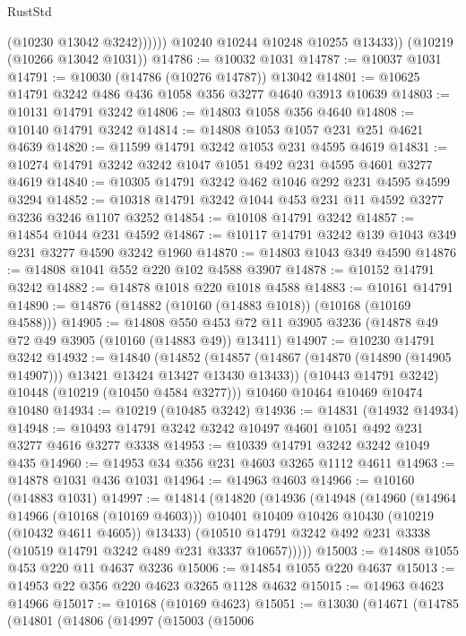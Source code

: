 \begin{lexlean}{RustStd}
\begin{coremodule}
                  (@10230 @13042 @3242))))))
        @10240
        @10244
        @10248
        @10255
        @13433))
    (@10219 (@10266 @13042 @1031))
@14786 := @10032 @1031
@14787 := @10037 @1031
@14791 := @10030 (@14786 (@10276 @14787)) @13042
@14801 := @10625 @14791 @3242 @486 @436 @1058 @356 @3277 @4640 @3913 @10639
@14803 := @10131 @14791 @3242
@14806 := @14803 @1058 @356 @4640
@14808 := @10140 @14791 @3242
@14814 := @14808 @1053 @1057 @231 @251 @4621 @4639
@14820 := @11599 @14791 @3242 @1053 @231 @4595 @4619
@14831 := @10274 @14791 @3242 @3242 @1047 @1051 @492 @231 @4595 @4601 @3277 @4619
@14840 := @10305 @14791 @3242 @462 @1046 @292 @231 @4595 @4599 @3294
@14852 := @10318 @14791 @3242 @1044 @453 @231 @11 @4592 @3277 @3236 @3246 @1107 @3252
@14854 := @10108 @14791 @3242
@14857 := @14854 @1044 @231 @4592
@14867 := @10117 @14791 @3242 @139 @1043 @349 @231 @3277 @4590 @3242 @1960
@14870 := @14803 @1043 @349 @4590
@14876 := @14808 @1041 @552 @220 @102 @4588 @3907
@14878 := @10152 @14791 @3242
@14882 := @14878 @1018 @220 @1018 @4588
@14883 := @10161 @14791
@14890 := @14876 (@14882 (@10160 (@14883 @1018)) (@10168 (@10169 @4588)))
@14905 := @14808
    @550
    @453
    @72
    @11
    @3905
    @3236
    (@14878 @49 @72 @49 @3905 (@10160 (@14883 @49)) @13411)
@14907 := @10230 @14791 @3242
@14932 := @14840
    (@14852
      (@14857 (@14867 (@14870 (@14890 (@14905 @14907))) @13421 @13424 @13427 @13430 @13433))
      (@10443 @14791 @3242)
      @10448
      (@10219 (@10450 @4584 @3277)))
    @10460
    @10464
    @10469
    @10474
    @10480
@14934 := @10219 (@10485 @3242)
@14936 := @14831 (@14932 @14934)
@14948 := @10493 @14791 @3242 @3242 @10497 @4601 @1051 @492 @231 @3277 @4616 @3277 @3338
@14953 := @10339 @14791 @3242 @3242 @1049 @435
@14960 := @14953 @34 @356 @231 @4603 @3265 @1112 @4611
@14963 := @14878 @1031 @436 @1031
@14964 := @14963 @4603
@14966 := @10160 (@14883 @1031)
@14997 := @14814
    (@14820
      (@14936
        (@14948
          (@14960
            (@14964 @14966 (@10168 (@10169 @4603)))
            @10401
            @10409
            @10426
            @10430
            (@10219 (@10432 @4611 @4605))
            @13433)
          (@10510 @14791 @3242 @492 @231 @3338 (@10519 @14791 @3242 @489 @231 @3337 @10657)))))
@15003 := @14808 @1055 @453 @220 @11 @4637 @3236
@15006 := @14854 @1055 @220 @4637
@15013 := @14953 @22 @356 @220 @4623 @3265 @1128 @4632
@15015 := @14963 @4623 @14966
@15017 := @10168 (@10169 @4623)
@15051 := @13030
    (@14671
      (@14785
        (@14801
          (@14806
            (@14997
              (@15003
                (@15006

\end{coremodule}
\end{lexlean}
